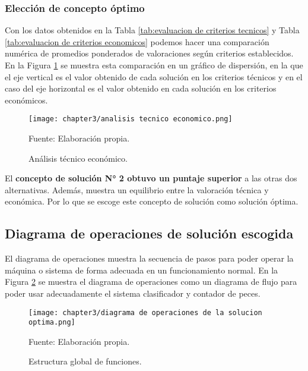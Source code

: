 \subsubsection{Elección de concepto óptimo}

Con los datos obtenidos en la Tabla \ref{tab:evaluacion de criterios tecnicos} y Tabla \ref{tab:evaluacion de criterios economicos} podemos hacer una comparación numérica de promedios ponderados de valoraciones según criterios establecidos. En la Figura \ref{fig:analisis tecnico economico} se muestra esta comparación en un gráfico de dispersión, en la que el eje vertical es el valor obtenido de cada solución en los criterios técnicos y en el caso del eje horizontal es el valor obtenido en cada solución en los criterios económicos.

\begin{figure}[H]
	\centering
	\texttt{[image: chapter3/analisis tecnico economico.png]}
	\caption{Análisis técnico económico.}
	Fuente: Elaboración propia.
	\label{fig:analisis tecnico economico}
\end{figure}

El \textbf{concepto de solución N° 2 obtuvo un puntaje superior} a las otras dos alternativas. Además, muestra un equilibrio entre la valoración técnica y económica. Por lo que se escoge este concepto de solución como solución óptima.

\subsection{Diagrama de operaciones de solución escogida}

El diagrama de operaciones muestra la secuencia de pasos para poder operar la máquina o sistema de forma adecuada en un funcionamiento normal. En la Figura \ref{fig:diagrama de operaciones de la solucion optima} se muestra el diagrama de operaciones como un diagrama de flujo para poder usar adecuadamente el sistema clasificador y contador de peces.


\newpage
\thispagestyle{mylandscape}
\begin{landscape}
	\begin{figure}[H]
		\centering
		\texttt{[image: chapter3/diagrama de operaciones de la solucion optima.png]}
		\caption{Estructura global de funciones.}
		Fuente: Elaboración propia.
		\label{fig:diagrama de operaciones de la solucion optima}
	\end{figure}
\end{landscape}

\newpage
\thispagestyle{fancy}









